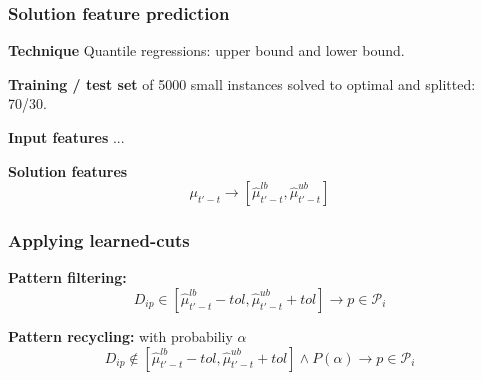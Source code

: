 \begin{frame}
\frametitle{\textbf{Solution feature prediction}}

  \begin{block}{\textbf{Technique}}
    Quantile regressions: upper bound and lower bound.
  \end{block}

  \begin{block}{\textbf{Training / test set}}
    of 5000 small instances solved to optimal and splitted: 70/30.
  \end{block}

  \begin{block}{\textbf{Input features}}
    ...
  \end{block}

  \begin{block}{\textbf{Solution features}}
    \begin{equation*}
      \mu_{t'-t} \to [\hat{\mu}_{t'-t}^{lb}, \hat{\mu}_{t'-t}^{ub}]
   \end{equation*}
  \end{block}

\end{frame}

\begin{frame}
\frametitle{\textbf{Applying learned-cuts}}

  \begin{block}{\textbf{Pattern filtering:}}
    \begin{equation*}
      D_{ip} \in [\hat{\mu}_{t'-t}^{lb} - tol, \hat{\mu}_{t'-t}^{ub} + tol] \rightarrow p \in \mathcal{P}_i 
    \end{equation*}
  \end{block}

  \begin{block}{\textbf{Pattern recycling:} with probabiliy $\alpha$}
    \begin{equation*}
      D_{ip} \notin [\hat{\mu}_{t'-t}^{lb} - tol, \hat{\mu}_{t'-t}^{ub} + tol] \land P(\alpha)  \rightarrow p \in \mathcal{P}_i 
    \end{equation*}
  \end{block}
\end{frame}

